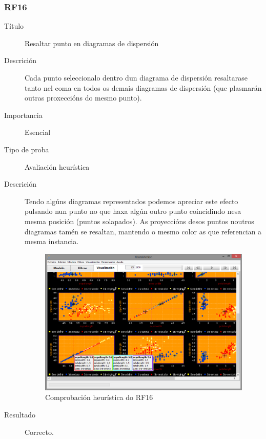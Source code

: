 \subsubsection*{RF16}
\begin{description}
\item[Título] \hfill
Resaltar punto en diagramas de dispersión
\item[Descrición] \hfill
Cada punto seleccionalo dentro dun diagrama de dispersión resaltarase tanto nel coma en todos os demais diagramas de dispersión (que plasmarán outras proxeccións do mesmo punto).
\item[Importancia] \hfill
Esencial
\item[Tipo de proba] \hfill
Avaliación heurística
\item[Descrición]
Tendo algúns diagramas representados podemos apreciar este efecto pulsando nun punto no que haxa algún outro punto coincidindo nesa mesma posición (puntos solapados). As proyeccións desos puntos noutros diagramas tamén se resaltan, mantendo o mesmo color as que referencian a mesma instancia.
\begin{figure}
\centering
\includegraphics[width=\textwidth,height=\textheight,keepaspectratio]{figuras/RF1516}
\caption{Comprobación heurística do RF16}
\label{RF1516}
\end{figure}
\item[Resultado]
Correcto.
\end{description}

